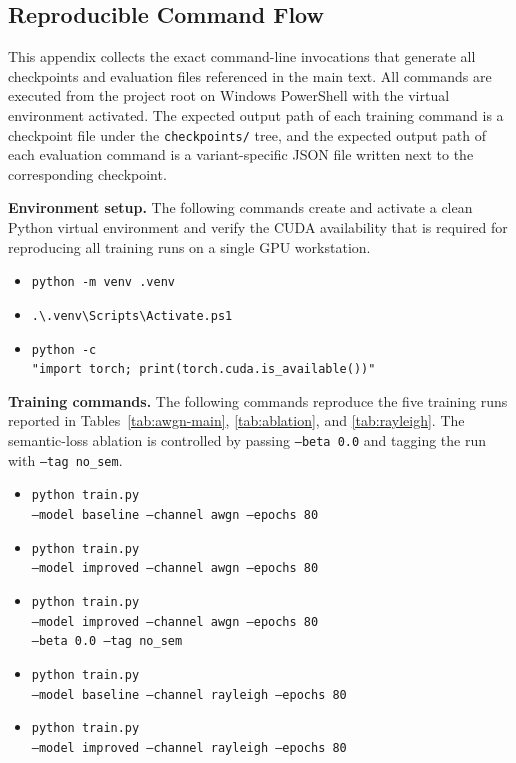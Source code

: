 \subsection{Reproducible Command Flow}

This appendix collects the exact command-line invocations that generate all checkpoints and evaluation files referenced in the main text. All commands are executed from the project root on Windows PowerShell with the virtual environment activated. The expected output path of each training command is a checkpoint file under the \texttt{checkpoints/} tree, and the expected output path of each evaluation command is a variant-specific JSON file written next to the corresponding checkpoint.

\textbf{Environment setup.} The following commands create and activate a clean Python virtual environment and verify the CUDA availability that is required for reproducing all training runs on a single GPU workstation.
\begin{itemize}
    \item \texttt{python -m venv .venv}
    \item \texttt{.\textbackslash .venv\textbackslash Scripts\textbackslash Activate.ps1}
    \item \texttt{python -c}\\
    \texttt{\phantom{xx}"import torch; print(torch.cuda.is\_available())"}
\end{itemize}

\textbf{Training commands.} The following commands reproduce the five training runs reported in Tables~\ref{tab:awgn-main}, \ref{tab:ablation}, and \ref{tab:rayleigh}. The semantic-loss ablation is controlled by passing \texttt{--beta 0.0} and tagging the run with \texttt{--tag no\_sem}.
\begin{itemize}
    \item \texttt{python train.py}\\
    \texttt{\phantom{xx}--model baseline --channel awgn --epochs 80}
    \item \texttt{python train.py}\\
    \texttt{\phantom{xx}--model improved --channel awgn --epochs 80}
    \item \texttt{python train.py}\\
    \texttt{\phantom{xx}--model improved --channel awgn --epochs 80}\\
    \texttt{\phantom{xx}--beta 0.0 --tag no\_sem}
    \item \texttt{python train.py}\\
    \texttt{\phantom{xx}--model baseline --channel rayleigh --epochs 80}
    \item \texttt{python train.py}\\
    \texttt{\phantom{xx}--model improved --channel rayleigh --epochs 80}
\end{itemize}

